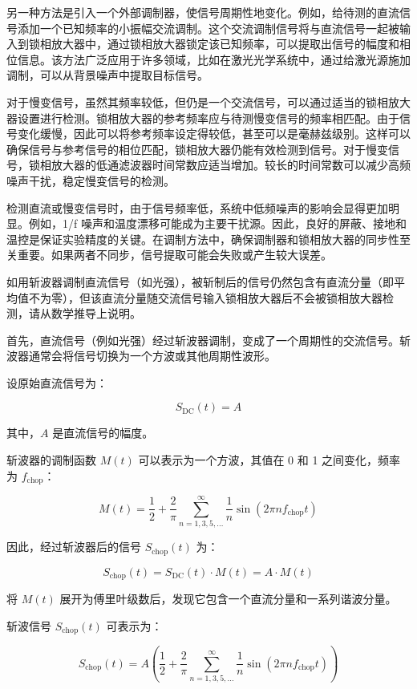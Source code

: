 另一种方法是引入一个外部调制器，使信号周期性地变化。例如，给待测的直流信号添加一个已知频率的小振幅交流调制。这个交流调制信号将与直流信号一起被输入到锁相放大器中，通过锁相放大器锁定该已知频率，可以提取出信号的幅度和相位信息。该方法广泛应用于许多领域，比如在激光光学系统中，通过给激光源施加调制，可以从背景噪声中提取目标信号。

对于慢变信号，虽然其频率较低，但仍是一个交流信号，可以通过适当的锁相放大器设置进行检测。锁相放大器的参考频率应与待测慢变信号的频率相匹配。由于信号变化缓慢，因此可以将参考频率设定得较低，甚至可以是毫赫兹级别。这样可以确保信号与参考信号的相位匹配，锁相放大器仍能有效检测到信号。对于慢变信号，锁相放大器的低通滤波器时间常数应适当增加。较长的时间常数可以减少高频噪声干扰，稳定慢变信号的检测。

检测直流或慢变信号时，由于信号频率低，系统中低频噪声的影响会显得更加明显。例如，1/f 噪声和温度漂移可能成为主要干扰源。因此，良好的屏蔽、接地和温控是保证实验精度的关键。在调制方法中，确保调制器和锁相放大器的同步性至关重要。如果两者不同步，信号提取可能会失败或产生较大误差。

\begin{question}
	如用斩波器调制直流信号（如光强），被斩制后的信号仍然包含有直流分量（即平均值不为零），但该直流分量随交流信号输入锁相放大器后不会被锁相放大器检测，请从数学推导上说明。
\end{question}
首先，直流信号（例如光强）经过斩波器调制，变成了一个周期性的交流信号。斩波器通常会将信号切换为一个方波或其他周期性波形。

设原始直流信号为：

\[
S_{\text{DC}}(t) = A
\]

其中，\( A \) 是直流信号的幅度。

斩波器的调制函数 \( M(t) \) 可以表示为一个方波，其值在 0 和 1 之间变化，频率为 \( f_{\text{chop}} \)：

\[
M(t) = \dfrac{1}{2} + \dfrac{2}{\pi} \sum_{n=1,3,5,\dots}^{\infty} \dfrac{1}{n} \sin(2\pi n f_{\text{chop}} t)
\]

因此，经过斩波器后的信号 \( S_{\text{chop}}(t) \) 为：

\[
S_{\text{chop}}(t) = S_{\text{DC}}(t) \cdot M(t) = A \cdot M(t)
\]

将 \( M(t) \) 展开为傅里叶级数后，发现它包含一个直流分量和一系列谐波分量。

斩波信号 \( S_{\text{chop}}(t) \) 可表示为：

\[
S_{\text{chop}}(t) = A \left( \dfrac{1}{2} + \dfrac{2}{\pi} \sum_{n=1,3,5,\dots}^{\infty} \dfrac{1}{n} \sin(2\pi n f_{\text{chop}} t) \right)
\]

